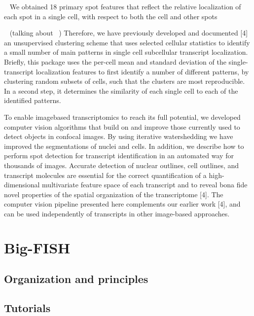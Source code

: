 
~\cite{battich_image-based_2013}
We obtained 18 primary spot features that reflect the
relative localization of each spot in a single cell, with respect to both the cell and other spots

~\cite{stoeger_computer_2015}
(talking about ~\cite{battich_image-based_2013})
Therefore, we have previously developed and documented [4] an unsupervised
clustering scheme that uses selected cellular statistics to identify a small
number of main patterns in single cell subcellular transcript localization.
Briefly, this package uses the per-cell mean and standard deviation of the
single-transcript localization features to first identify a number of
different patterns, by clustering random subsets of cells, such that
the clusters are most reproducible. In a second step, it determines the
similarity of each single cell to each of the identified patterns.

To enable imagebased transcriptomics to reach its full potential, we developed
computer vision algorithms that build on and improve those currently used to
detect objects in confocal images. By using iterative watershedding we have
improved the segmentations of nuclei and cells. In addition, we describe how
to perform spot detection for transcript identification in an automated way for
thousands of images. Accurate detection of nuclear outlines, cell outlines, and
transcript molecules are essential for the correct quantification of a
high-dimensional multivariate feature space of each transcript and to reveal
bona fide novel properties of the spatial organization of the transcriptome [4].
The computer vision pipeline presented here complements our earlier work [4],
and can be used independently of transcripts in other image-based approaches.



\section{Big-FISH}


\subsection{Organization and principles}

\subsection{Tutorials}


